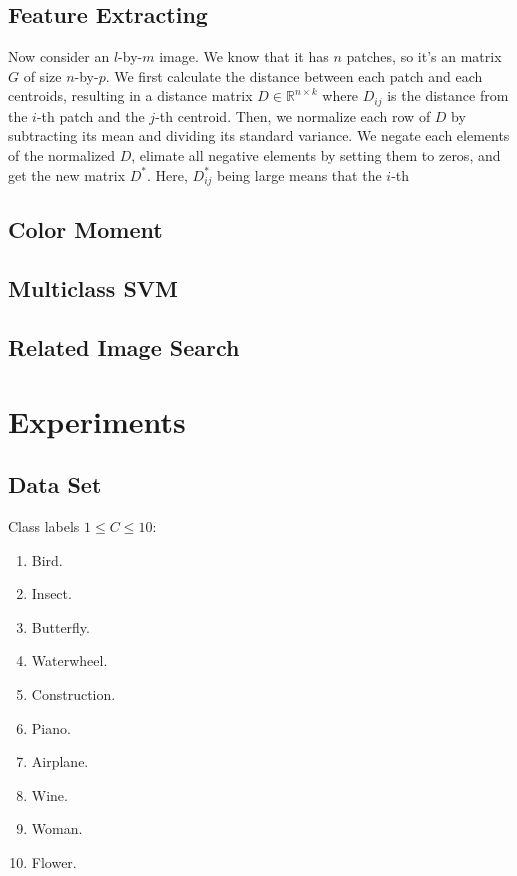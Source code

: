 \documentclass{acm_proc_article-sp}
\begin{document}

\subsection{Feature Extracting}

Now consider an $l$-by-$m$ image.
We know that it has $n$ patches, so it's an matrix $G$ of size $n$-by-$p$.
We first calculate the distance between each patch
and each centroids, resulting in a distance matrix $D\in\mathbb{R}^{n\times k}$
where $D_{ij}$ is the distance from the $i$-th patch
and the $j$-th centroid.
Then, we normalize each row of $D$ by
    subtracting its mean and dividing its standard variance.
We negate each elements of the normalized $D$, elimate
    all negative elements by setting them to zeros,
    and get the new matrix $D^*$.
Here, $D^*_{ij}$ being large means that the $i$-th

\subsection{Color Moment}

\subsection{Multiclass SVM}

\subsection{Related Image Search}

\section{Experiments}

\subsection{Data Set}
Class labels $1\leq C \leq 10$:
\begin{enumerate}[1.]
\item Bird.
\item Insect.
\item Butterfly.
\item Waterwheel.
\item Construction.
\item Piano.
\item Airplane.
\item Wine.
\item Woman.
\item Flower.
\end{enumerate}
\end{document}
